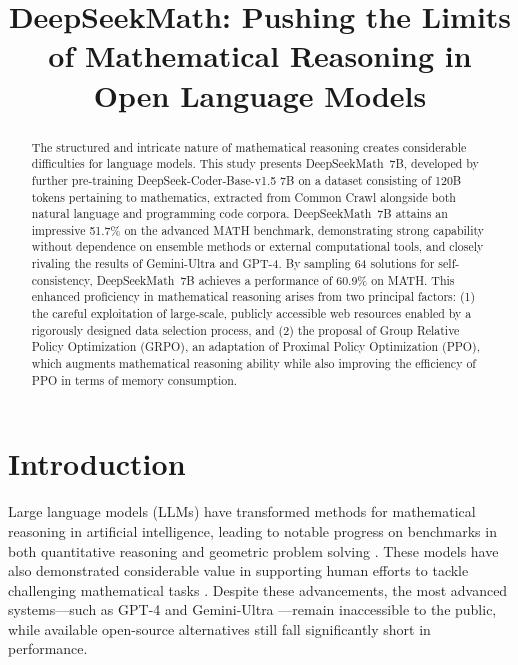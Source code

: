 \title{DeepSeekMath: Pushing the Limits of Mathematical Reasoning in Open Language Models}

\begin{abstract}
The structured and intricate nature of mathematical reasoning creates considerable difficulties for language models. This study presents DeepSeekMath~7B, developed by further pre-training DeepSeek-Coder-Base-v1.5 7B on a dataset consisting of 120B tokens pertaining to mathematics, extracted from Common Crawl alongside both natural language and programming code corpora. DeepSeekMath~7B attains an impressive 51.7\% on the advanced MATH benchmark, demonstrating strong capability without dependence on ensemble methods or external computational tools, and closely rivaling the results of Gemini-Ultra and GPT-4. By sampling 64 solutions for self-consistency, DeepSeekMath~7B achieves a performance of 60.9\% on MATH. This enhanced proficiency in mathematical reasoning arises from two principal factors: (1) the careful exploitation of large-scale, publicly accessible web resources enabled by a rigorously designed data selection process, and (2) the proposal of Group Relative Policy Optimization (GRPO), an adaptation of Proximal Policy Optimization (PPO), which augments mathematical reasoning ability while also improving the efficiency of PPO in terms of memory consumption.
\end{abstract}

\section{Introduction}

Large language models (LLMs) have transformed methods for mathematical reasoning in artificial intelligence, leading to notable progress on benchmarks in both quantitative reasoning \citep{MATH} and geometric problem solving \citep{trinh2024solving}. These models have also demonstrated considerable value in supporting human efforts to tackle challenging mathematical tasks \citep{tao}. Despite these advancements, the most advanced systems—such as GPT-4 \citep{gpt4} and Gemini-Ultra \citep{gemini}—remain inaccessible to the public, while available open-source alternatives still fall significantly short in performance.

